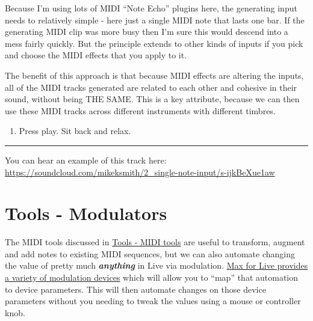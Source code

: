 \documentclass[
  12pt,
  letterpaper,
  oneside,
  open=any]{scrbook}
\providecommand{\tightlist}{%
  \setlength{\itemsep}{0pt}\setlength{\parskip}{0pt}}\usepackage{longtable,booktabs,array}
\begin{document}
Because I'm using lots of MIDI ``Note Echo'' plugins here, the
generating input needs to relatively simple - here just a single MIDI
note that lasts one bar. If the generating MIDI clip was more busy then
I'm sure this would descend into a mess fairly quickly. But the
principle extends to other kinds of inputs if you pick and choose the
MIDI effects that you apply to it.

The benefit of this approach is that because MIDI effects are altering
the inputs, all of the MIDI tracks generated are related to each other
and cohesive in their sound, without being THE SAME. This is a key
attribute, because we can then use these MIDI tracks across different
instruments with different timbres.

\begin{enumerate}
\def\labelenumi{\arabic{enumi}.}
\setcounter{enumi}{9}
\tightlist
\item
  Press play. Sit back and relax.
\end{enumerate}

\begin{center}\rule{0.5\linewidth}{0.5pt}\end{center}

You can hear an example of this track here:
\href{https://soundcloud.com/mikeksmith/2_single-note-input/s-ijkBeXue1aw?in=mikeksmith/sets/the-lazy-producer-recipes/s-PGMEWqfwKGz&si=4cb32f77057549d28894966ca45a2715&utm_source=clipboard&utm_medium=text&utm_campaign=social_sharing}{https://soundcloud.com/mikeksmith/2\_single-note-input/s-ijkBeXue1aw}


\chapter{Tools - Modulators}\label{Chapter-007-Tools-Modulators}

The MIDI tools discussed in
\hyperref[Chapter-004-Tools-MIDI_tools]{Tools - MIDI tools} are useful
to transform, augment and add notes to existing MIDI sequences, but we
can also automate changing the value of pretty much
\textbf{\emph{anything}} in Live via modulation.
\href{https://www.ableton.com/en/live-manual/11/max-for-live-devices/\#max-for-live-audio-effects}{Max
for Live provides a variety of modulation devices} which will allow you
to ``map'' that automation to device parameters. This will then automate
changes on those device parameters without you needing to tweak the
values using a mouse or controller knob.
\end{document}
